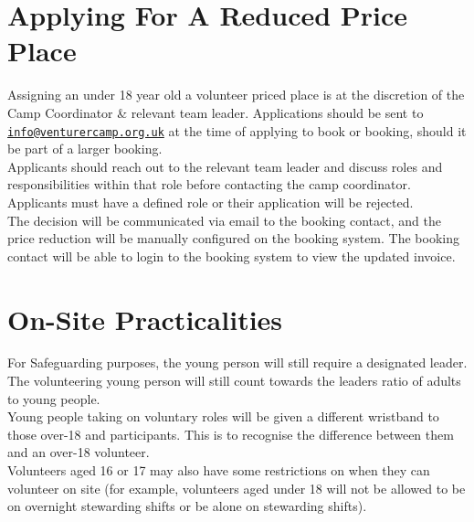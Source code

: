 \documentclass[a4paper, 11pt]{article}
\begin{document}
    \section{Applying For A Reduced Price Place}
    Assigning an under 18 year old a volunteer priced place is at the discretion of the Camp Coordinator \& relevant team leader. Applications should be sent to \href{mailto:info@venturercamp.org.uk}{\texttt{info@venturercamp.org.uk}} at the time of applying to book or booking, should it be part of a larger booking.\\

    Applicants should reach out to the relevant team leader and discuss roles and responsibilities within that role before contacting the camp coordinator. Applicants must have a defined role or their application will be rejected.\\

    The decision will be communicated via email to the booking contact, and the price reduction will be manually configured on the booking system. The booking contact will be able to login to the booking system to view the updated invoice. 

    \section{On-Site Practicalities}
    For Safeguarding purposes, the young person will still require a designated leader. The volunteering young person will still count towards the leaders ratio of adults to young people.\\

    Young people taking on voluntary roles will be given a different wristband to those over-18 and participants. This is to recognise the difference between them and an over-18 volunteer. \\
    
    Volunteers aged 16 or 17 may also have some restrictions on when they can volunteer on site (for example, volunteers aged under 18 will not be allowed to be on overnight stewarding shifts or be alone on stewarding shifts). 

    \backPage
\end{document}
